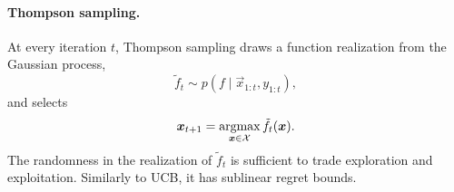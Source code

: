 \paragraph{Thompson sampling.}

At every iteration $t$, Thompson sampling draws a function realization from the
Gaussian process, \[
    \tilde{f}_t \sim p(f\mid \vec{x}_{1:t},y_{1:t}),
\] and selects \[
    \bm{x}_{t+1} = \operatorname*{argmax}_{\bm{x}\in\mathcal{X}} \tilde{f}_t(\bm{x}).
\]
The randomness in the realization of $\tilde{f}_t$ is sufficient to trade
exploration and exploitation. Similarly to UCB, it has sublinear regret bounds.
